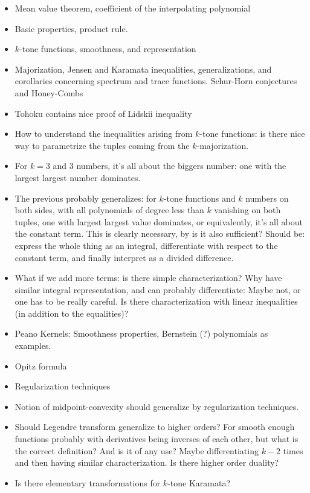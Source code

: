 \begin{itemize}
	\item Mean value theorem, coefficient of the interpolating polynomial
	\item Basic properties, product rule.
	\item $k$-tone functions, smoothness, and representation
	\item Majorization, Jensen and Karamata inequalities, generalizations, and corollaries concerning spectrum and trace functions. Schur-Horn conjectures and Honey-Combs
	\item Tohoku contains nice proof of Lidskii inequality
	\item How to understand the inequalities arising from $k$-tone functions: is there nice way to parametrize the tuples coming from the $k$-majorization.
	\item For $k = 3$ and $3$ numbers, it's all about the biggers number: one with the largest largest number dominates.
	\item The previous probably generalizes: for $k$-tone functions and $k$ numbers on both sides, with all polynomials of degree less than $k$ vanishing on both tuples, one with largest largest value dominates, or equivalently, it's all about the constant term. This is clearly necessary, by is it also sufficient? Should be: express the whole thing as an integral, differentiate with respect to the constant term, and finally interpret as a divided difference.
	\item What if we add more terms: is there simple characterization? Why have similar integral representation, and can probably differentiate: Maybe not, or one has to be really careful. Is there characterization with linear inequalities (in addition to the equalities)?
	\item Peano Kernels: Smoothness properties, Bernstein (?) polynomials as examples.
	\item Opitz formula
	\item Regularization techniques
	\item Notion of midpoint-convexity should generalize by regularization techniques.
	\item Should Legendre transform generalize to higher orders?  For smooth enough functions probably with derivatives being inverses of each other, but what is the correct definition? And is it of any use? Maybe differentiating $k - 2$ times and then having similar characterization. Is there higher order duality?
	\item Is there elementary transformations for $k$-tone Karamata?

\end{itemize}
